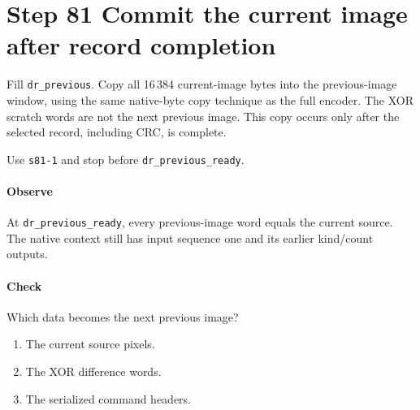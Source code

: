 \section{Step 81 Commit the current image after record completion}
Fill \texttt{dr\_previous}. Copy all 16\,384 current-image bytes into the previous-image window, using the same native-byte copy technique as the full encoder. The XOR scratch words are not the next previous image. This copy occurs only after the selected record, including CRC, is complete.

Use \texttt{s81-1} and stop before \texttt{dr\_previous\_ready}.

\paragraph{Observe} At \texttt{dr\_previous\_ready}, every previous-image word equals the current source. The native context still has input sequence one and its earlier kind/count outputs.

\paragraph{Check} Which data becomes the next previous image?
\begin{enumerate}[label=\Alph*.]
\item The current source pixels.
\item The XOR difference words.
\item The serialized command headers.
\end{enumerate}
